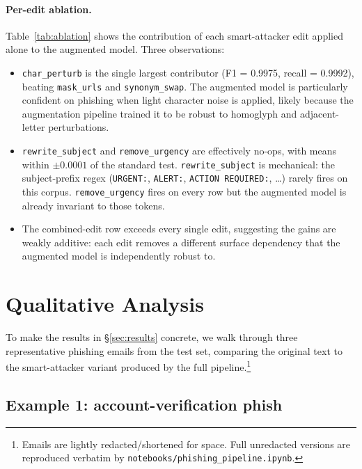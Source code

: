 \documentclass[conference]{IEEEtran}
\begin{document}
\paragraph{Per-edit ablation.} Table~\ref{tab:ablation} shows the
contribution of each smart-attacker edit applied alone to the augmented
model. Three observations:
\begin{itemize}
  \item \texttt{char\_perturb} is the single largest contributor
        (F1 = 0.9975, recall = 0.9992), beating \texttt{mask\_urls} and
        \texttt{synonym\_swap}. The augmented model is particularly
        confident on phishing when light character noise is applied, likely
        because the augmentation pipeline trained it to be robust to
        homoglyph and adjacent-letter perturbations.
  \item \texttt{rewrite\_subject} and \texttt{remove\_urgency} are
        effectively no-ops, with means within $\pm 0.0001$ of the
        standard test. \texttt{rewrite\_subject} is mechanical: the
        subject-prefix regex (\texttt{URGENT:}, \texttt{ALERT:},
        \texttt{ACTION REQUIRED:}, \ldots) rarely fires on this corpus.
        \texttt{remove\_urgency} fires on every row but the augmented model
        is already invariant to those tokens.
  \item The combined-edit row exceeds every single edit, suggesting
        the gains are weakly additive: each edit removes a different
        surface dependency that the augmented model is independently
        robust to.
\end{itemize}

\section{Qualitative Analysis}
\label{sec:qualitative}

To make the results in \S\ref{sec:results} concrete, we walk through three
representative phishing emails from the test set, comparing the original
text to the smart-attacker variant produced by the full pipeline.\footnote{
Emails are lightly redacted/shortened for space. Full unredacted versions
are reproduced verbatim by \texttt{notebooks/phishing\_pipeline.ipynb}.}

\subsection{Example 1: account-verification phish}
\end{document}
